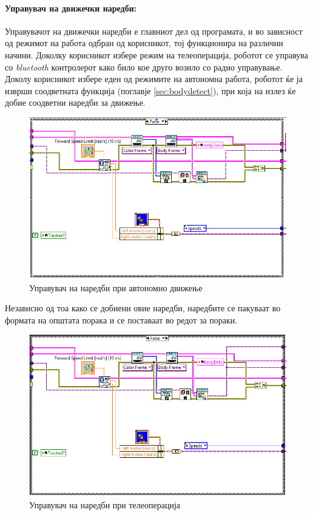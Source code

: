\documentclass[12pt]{article}
\begin{document}
    \paragraph{Управувач на движечки наредби:\\}
      Управувачот на движечки наредби е главниот дел од програмата, и во зависност од режимот на работа одбран од корисникот, тој функционира на различни начини. Доколку корисникот избере режим на телеоперација, роботот се управува со \textit{bluetooth} контролерот како било кое друго возило со радио управување. Доколу корисникот избере еден од режимите на автономна работа, роботот ќе ја изврши соодветната функција (поглавје \ref{sec:bodydetect}), при која на излез ќе добие соодветни наредби за движење.
      \begin{figure}[H]
        \centering
        \includegraphics[angle=-90, scale=0.65]{./images/command_generator_true.PNG}
        \caption{Управувач на наредби при автономно движење}
      \end{figure}
      Независно од тоа како се добиени овие наредби, наредбите се пакуваат во формата на општата порака и се поставаат во редот за пораки.
      \begin{figure}[H]
        \centering
        \includegraphics[width=0.8\linewidth]{./images/command_generator_false.PNG}
        \caption{Управувач на наредби при телеоперација}
      \end{figure}
    \bigbreak
\end{document}
